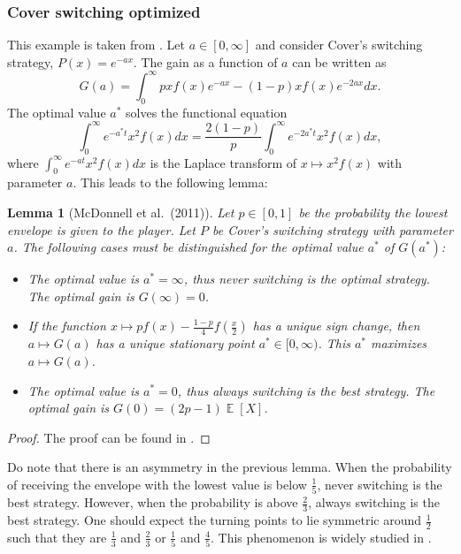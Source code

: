 \documentclass[a4paper]{report}
\theoremstyle{plain}
\newtheorem{lemma}[theorem]{Lemma}
\theoremstyle{definition}
\theoremstyle{remark}
\numberwithin{equation}{chapter}
\DeclareMathOperator{\E}{\mathbb{E}}
\DeclareMathOperator{\1}{\mathbbm{1}}
\begin{document}
\subsubsection{Cover switching optimized}
This example is taken from \cite{McDonnell11}. Let $a\in[0,\infty]$ and consider Cover's switching strategy, $P(x)=e^{-ax}$. The gain as a function of $a$ can be written as
\begin{equation}
G(a)=\int_0^\infty pxf(x)e^{-ax}-(1-p)xf(x)e^{-2ax}dx.
\end{equation}
The optimal value $a^*$ solves the functional equation
\begin{equation}
\int_0^\infty e^{-a^*t}x^2f(x)dx=\frac{2(1-p)}{p}\int_0^\infty e^{-2a^*t}x^2f(x)dx,
\end{equation}
where $\int_0^\infty e^{-at}x^2f(x)dx$ is the Laplace transform of $x\mapsto x^2f(x)$ with parameter $a$. This leads to the following lemma:
\begin{lemma}[McDonnell et al.~(2011)]
Let $p\in[0,1]$ be the probability the lowest envelope is given to the player. Let $P$ be Cover's switching strategy with parameter $a$. The following cases must be distinguished for the optimal value $a^*$ of $G(a^*)$:
\begin{itemize}
    \item[{$p\in\left[0,\frac{1}{5}\right)$:}]
    The optimal value is $a^*=\infty$, thus never switching is the optimal strategy. The optimal gain is $G(\infty)=0$.
    \item[{$p\in\left[\frac{1}{5},\frac{2}{3}\right)$:}]
    If the function $x\mapsto pf(x)-\frac{1-p}{4}f\left(\frac{x}{2}\right)$ has a unique sign change, then $a\mapsto G(a)$ has a unique stationary point $a^*\in[0,\infty)$. This $a^*$ maximizes $a\mapsto G(a)$.
    \item[{$p\in\left[\frac{2}{3},1\right]$:}]
    The optimal value is $a^*=0$, thus always switching is the best strategy. The optimal gain is $G(0)=(2p-1)\E[X]$.
\end{itemize}
\end{lemma}
\begin{proof}
The proof can be found in \cite{McDonnell11}.
\end{proof}
Do note that there is an asymmetry in the previous lemma. When the probability of receiving the envelope with the lowest value is below $\frac{1}{5}$, never switching is the best strategy. However, when the probability is above $\frac{2}{3}$, always switching is the best strategy. One should expect the turning points to lie symmetric around $\frac{1}{2}$ such that they are $\frac{1}{3}$ and $\frac{2}{3}$ or $\frac{1}{5}$ and $\frac{4}{5}$. This phenomenon is widely studied in \cite{McDonnell11}.
\end{document}
